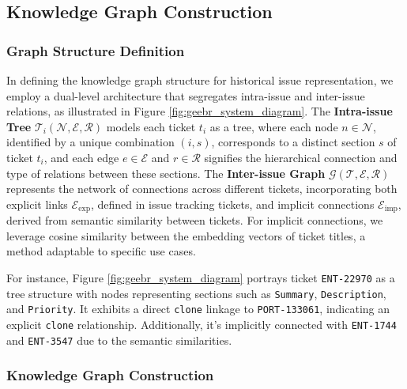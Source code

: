 \documentclass[sigconf]{acmart}
\begin{document}
\subsection{Knowledge Graph Construction}

\subsubsection{Graph Structure Definition}
In defining the knowledge graph structure for historical issue representation, we employ a dual-level architecture that segregates intra-issue and inter-issue relations, as illustrated in Figure \ref{fig:geebr_system_diagram}. The \textbf{Intra-issue Tree} \(\mathcal{T}_i(\mathcal{N}, \mathcal{E}, \mathcal{R})\) models each ticket \(t_i\) as a tree, where each node \(n \in \mathcal{N}\), identified by a unique combination \((i, s)\), corresponds to a distinct section \(s\) of ticket \(t_i\), and each edge \(e \in \mathcal{E}\) and \(r \in \mathcal{R}\) signifies the hierarchical connection and type of relations between these sections. The \textbf{Inter-issue Graph} \(\mathcal{G}(\mathcal{T}, \mathcal{E}, \mathcal{R})\) represents the network of connections across different tickets, incorporating both explicit links \(\mathcal{E}_{\text{exp}}\), defined in issue tracking tickets, and implicit connections \(\mathcal{E}_{\text{imp}}\), derived from semantic similarity between tickets. For implicit connections, we leverage cosine similarity between the embedding vectors of ticket titles, a method adaptable to specific use cases.

For instance, Figure \ref{fig:geebr_system_diagram} portrays ticket \texttt{ENT-22970} as a tree structure with nodes representing sections such as \texttt{Summary}, \texttt{Description}, and \texttt{Priority}. It exhibits a direct \texttt{clone} linkage to \texttt{PORT-133061}, indicating an explicit \texttt{clone} relationship. Additionally, it’s implicitly connected with \texttt{ENT-1744} and \texttt{ENT-3547} due to the semantic similarities.




\subsubsection{Knowledge Graph Construction}
\label{subsubsection: offline_graph_construction}
\end{document}
